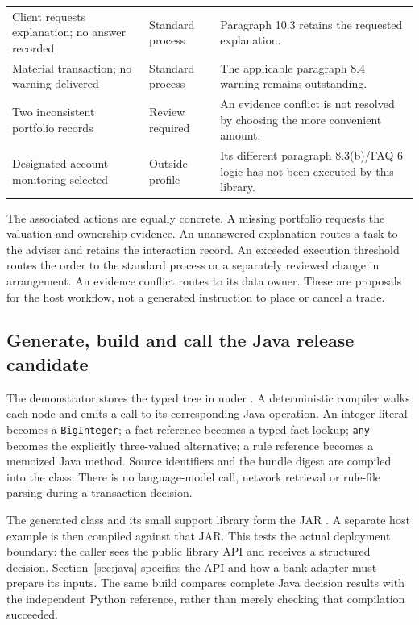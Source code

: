 \begin{longtable}{P{0.38\textwidth}P{0.19\textwidth}P{0.33\textwidth}}
Client requests explanation; no answer recorded & Standard process & Paragraph 10.3 retains the requested explanation.\\
Material transaction; no warning delivered & Standard process & The applicable paragraph 8.4 warning remains outstanding.\\
Two inconsistent portfolio records & Review required & An evidence conflict is not resolved by choosing the more convenient amount.\\
Designated-account monitoring selected & Outside profile & Its different paragraph 8.3(b)/FAQ 6 logic has not been executed by this library.\\
\bottomrule
\end{longtable}
\endgroup

The associated actions are equally concrete. A missing portfolio requests the
valuation and ownership evidence. An unanswered explanation routes a task to the
adviser and retains the interaction record. An exceeded execution threshold
routes the order to the standard process or a separately reviewed change in
arrangement. An evidence conflict routes to its data owner. These are proposals
for the host workflow, not a generated instruction to place or cancel a trade.

\subsection{Generate, build and call the Java release candidate}
\label{merge:P-01b-complete-dry-run:05}


The demonstrator stores the typed tree in 
under . A deterministic
compiler walks each node and emits a call to its corresponding Java operation.
An integer literal becomes a \texttt{BigInteger}; a fact reference becomes a
typed fact lookup; \texttt{any} becomes the explicitly three-valued alternative;
a rule reference becomes a memoized Java method. Source identifiers and the
bundle digest are compiled into the class. There is no language-model call,
network retrieval or rule-file parsing during a transaction decision.

The generated class and its small support library form the JAR
. A separate host example is
then compiled against that JAR. This tests the actual deployment boundary:
the caller sees the public library API and receives a structured decision.
Section~\ref{sec:java} specifies the API and how a bank adapter must prepare
its inputs. The same build compares complete Java decision results with the
independent Python reference, rather than merely checking that compilation
succeeded.

